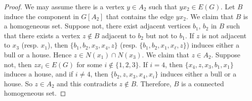 \documentclass[a4paper,11pt]{article}
\theoremstyle{case}
\begin{document}
\begin{proof}
    
    We may assume there is a vertex $y\in A_2$ such that $yx_2\in E(G)$. Let $B$ induce the component in $G[A_2]$ that contains the edge $yx_2$. We claim that $B$ is a homogeneous set. Suppose not, there exist adjacent vertices $b_1$, $b_2$ in $B$ such that there exists a vertex $z\notin B$ adjacent to $b_2$ but not to $b_1$. If $z$ is not adjacent to $x_3$ (resp. $x_1$), then $\{  b_1, b_2, x_3, x_4, z\}$ (resp. $\{ b_1, b_2,x_1, x_\ell,  z\}$) induces either a bull or a house. Hence $z\in N(x_1)\cap N(x_3)$.  We claim that $z\in A_2$. Suppose not, then $zx_{i}\in E(G)$ for some $i\notin \{1,2,3\}$. If $i=4$, then $\{x_4, z ,x_3, b_1, x_1\}$ induces a house, and if $i\neq 4$, then $\{ b_2, z,  x_3, x_4, x_i\}$ induces either a bull or a house. So $z\in A_2$ and this contradicts $z\notin B$. Therefore, $B$ is a connected homogeneous set.
\end{proof}
    
    
\end{document}
